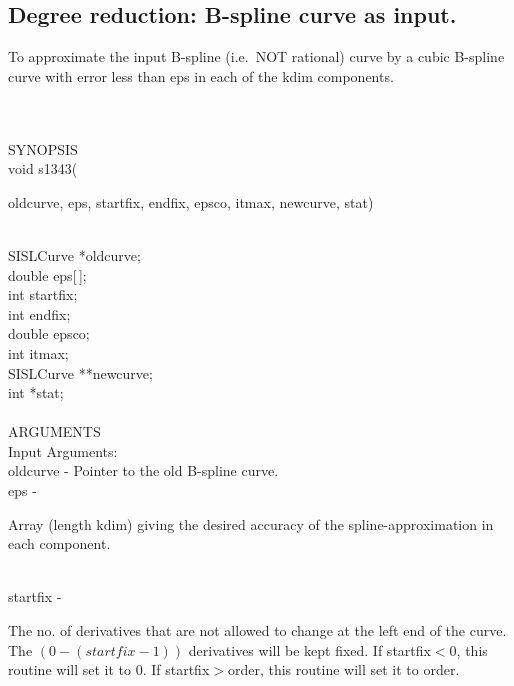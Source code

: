 \subsection{Degree reduction: B-spline curve as input.}
\begin{minipg1}
  To approximate the input B-spline (i.e.\ NOT rational) curve by a
  cubic B-spline curve with error less than {\fov eps} in each of the
  {\fov kdim} components.
\end{minipg1} \\ \\
SYNOPSIS\\
        \>void s1343(\begin{minipg3}
        {\fov oldcurve}, {\fov eps}, {\fov startfix}, {\fov endfix}, {\fov epsco},
        {\fov itmax}, {\fov newcurve}, {\fov stat})
                \end{minipg3}\\[0.3ex]
                \>\>    SISLCurve       \>      *{\fov oldcurve};\\
                \>\>    double  \>      {\fov eps}[\,];\\
                \>\>    int     \>      {\fov startfix};\\
                \>\>    int     \>      {\fov endfix};\\
                \>\>    double  \>      {\fov epsco};\\
                \>\>    int     \>      {\fov itmax};\\
                \>\>    SISLCurve       \>      **{\fov newcurve};\\
                \>\>    int     \>      *{\fov stat};\\
\\
ARGUMENTS\\
        \>Input Arguments:\\
        \>\>    {\fov oldcurve}\> - \> Pointer to the old B-spline curve.\\
        \>\>    {\fov eps}      \> - \> \begin{minipg2}
                        Array (length kdim) giving the desired accuracy of
                                the spline-approximation in each component.
                                \end{minipg2}\\[0.3ex]
        \>\>    {\fov startfix}\> - \>  \begin{minipg2}
                        The no. of derivatives that are not allowed to
                        change at the left end of the curve.
                        The $(0 - (startfix-1))$ derivatives
                        will be kept fixed. If startfix$<$0, this
                        routine will set it to 0. If startfix$>$order,
                        this routine will set it to order.
                                \end{minipg2}\\[0.8ex]
